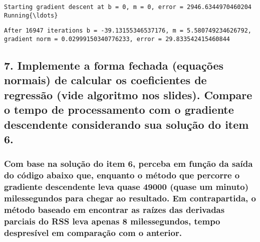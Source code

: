\documentclass[11pt]{article}
\begin{document}
    \begin{Verbatim}[commandchars=\\\{\}]
Starting gradient descent at b = 0, m = 0, error = 2946.6344970460204
Running{\ldots}

    \end{Verbatim}

    
    
    \begin{Verbatim}[commandchars=\\\{\}]
After 16947 iterations b = -39.13155346537176, m = 5.580749234626792, gradient norm = 0.02999150340776233, error = 29.833542415460844

    \end{Verbatim}

    \subsection{7. Implemente a forma fechada (equações normais) de calcular
os coeficientes de regressão (vide algoritmo nos slides). Compare o
tempo de processamento com o gradiente descendente considerando sua
solução do item
6.}\label{implemente-a-forma-fechada-equauxe7uxf5es-normais-de-calcular-os-coeficientes-de-regressuxe3o-vide-algoritmo-nos-slides.-compare-o-tempo-de-processamento-com-o-gradiente-descendente-considerando-sua-soluuxe7uxe3o-do-item-6.}

\subsubsection{Com base na solução do item 6, perceba em função da saída
do código abaixo que, enquanto o método que percorre o gradiente
descendente leva quase 49000 (quase um minuto) milessegundos para chegar
ao resultado. Em contrapartida, o método baseado em encontrar as raízes
das derivadas parciais do RSS leva apenas 8 milessegundos, tempo
despresível em comparação com o
anterior.}\label{com-base-na-soluuxe7uxe3o-do-item-6-perceba-em-funuxe7uxe3o-da-sauxedda-do-cuxf3digo-abaixo-que-enquanto-o-muxe9todo-que-percorre-o-gradiente-descendente-leva-quase-49000-quase-um-minuto-milessegundos-para-chegar-ao-resultado.-em-contrapartida-o-muxe9todo-baseado-em-encontrar-as-rauxedzes-das-derivadas-parciais-do-rss-leva-apenas-8-milessegundos-tempo-despresuxedvel-em-comparauxe7uxe3o-com-o-anterior.}
\end{document}

